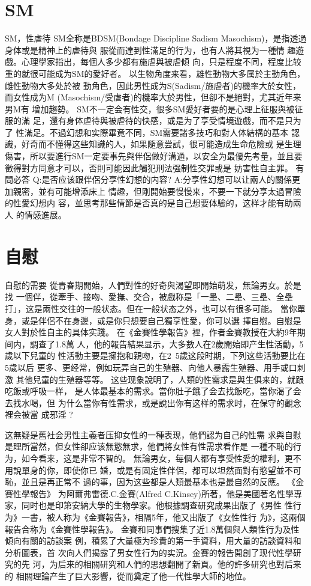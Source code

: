 \documentclass[12pt,UTF8]{ctexbook}
\begin{document}
\chapter{SM}

SM，性虐待
SM全称是BDSM(Bondage Discipline Sadism
Masochism)，是指透過身体或是精神上的虐待與
服從而達到性滿足的行为，也有人將其視为一種情
趣遊戲。心理學家指出，每個人多少都有施虐與被虐傾
向，只是程度不同，程度比较重的就很可能成为SM的愛好者。
以生物角度来看，雄性動物大多属於主動角色，雌性動物大多处於被
動角色，因此男性成为S(Sadism/施虐者)的機率大於女性，而女性成为M
(Masochism/受虐者)的機率大於男性，但卻不是絕對，尤其近年来男M有
增加趨勢。
SM不一定会有性交，很多SM愛好者要的是心理上征服與被征服的滿
足，還有身体虐待與被虐待的快感，或是为了享受情境遊戲，而不是只为了
性滿足。不過幻想和实際畢竟不同，SM需要諸多技巧和對人体結構的基本
認識，好奇而不懂得这些知識的人，如果隨意尝試，很可能造成生命危險或
是生理傷害，所以要進行SM一定要事先與伴侶做好溝通，以安全为最優先考量，並且要徵得對方同意才可以，否則可能因此觸犯刑法强制性交罪或是
妨害性自主罪。
有問必答
Q:是否应该跟伴侶分享性幻想的内容?
A:分享性幻想可以让兩人的關係更加親密，並有可能增添床上
情趣，但剛開始要慢慢来，不要一下就分享太過冒險的性愛幻想内
容，並思考那些情節是否真的是自己想要体驗的，这样才能有助兩人
的情感進展。

\chapter{自慰}

自慰的需要
從青春期開始，人們對性的好奇與渴望即開始萌发，無論男女。於是找
一個伴，從牽手、接吻、愛撫、交合，被戲称是「一壘、二壘、三壘、全壘
打」，这是兩性交往的一般状态。但在一般状态之外，也可以有很多可能。
當你單身，或是伴侶不在身邊，或是你只想要自己獨享性愛，你可以選
擇自慰。自慰是女人對於性自主的具体实踐。
在《金賽性學報告》裡，作者金賽教授在大約9年期间内，調查了1.8萬
人，他的報告結果显示，大多數人在2歲開始即产生性活動，5歲以下兒童的
性活動主要是擁抱和親吻，在2~5歲这段时期，下列这些活動要比在5歲以后
更多、更经常，例如玩弄自己的生殖器、向他人暴露生殖器、用手或口刺激
其他兒童的生殖器等等。
这些现象說明了，人類的性需求是與生俱来的，就跟吃飯或呼吸一样，
是人体最基本的需求。當你肚子餓了会去找飯吃，當你渴了会去找水喝，但
为什么當你有性需求，或是說出你有这样的需求时，在保守的觀念裡会被當
成邪淫 ?

这無疑是舊社会男性主義者压抑女性的一種表现，他們認为自己的性需
求與自慰是理所當然，但女性卻应该無慾無求，他們將女性有性需求看作是
一種不恥的行为，如今看来，这是非常不智的。
無論男女，每個人都有享受性愛的權利，更不用說單身的你，即使你已
婚，或是有固定性伴侶，都可以坦然面對有慾望並不可恥，並且是再正常不
過的事，因为这些都是人類最基本也是最自然的反應。
《金賽性學報告》
为阿爾弗雷德.C.金賽(Alfred C.Kinsey)所著，他是美國著名性學專
家，同时也是印第安納大學的生物學家。他根據調查研究成果出版了《男性
性行为》一書，被人称为《金賽報告》，相隔5年，他又出版了《女性性行
为》，这兩個報告合称为《金賽性學報告》。
金賽和同事們搜集了近1.8萬個與人類性行为及性傾向有關的訪談案
例，積累了大量極为珍貴的第一手資料，用大量的訪談資料和分析圖表，首
次向人們揭露了男女性行为的实況。金賽的報告開創了现代性學研究的先
河，为后来的相關研究和人們的思想翻開了新頁。他的許多研究也對后来的
相關理論产生了巨大影響，從而奠定了他一代性學大師的地位。
\end{document}
